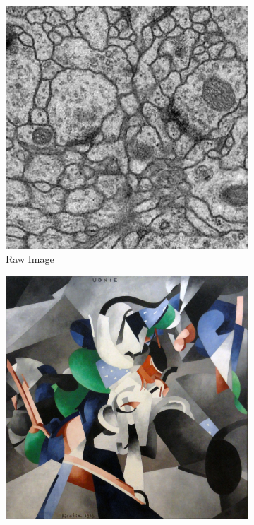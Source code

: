 \documentclass[12pt, a4paper]{scrartcl}
\begin{document}
\begin{figure}[H]
\centering
\begin{subfigure}{.34\textwidth}
  \centering
  \includegraphics[width=.9\linewidth]{ISBI0}
  \caption{Raw Image}
  \label{fig:nas211}
\end{subfigure}%
\begin{subfigure}{.28\textwidth}
  \centering
  \includegraphics[width=.99\linewidth]{udnie}

\end{subfigure}
\end{figure}
\end{document}
